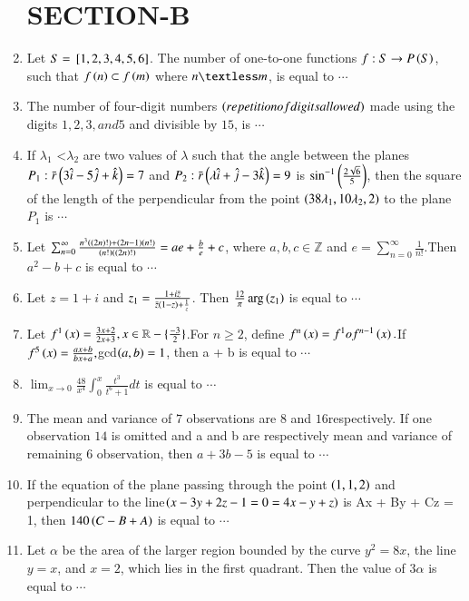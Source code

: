 \documentclass[journal,12pt,twocolumn]{IEEEtran}
\theoremstyle{remark}
\begin{document}
\begin{enumerate}[start=16]
\section{SECTION-B}
\item Let $S = {}\left[1, 2, 3, 4, 5, 6\right]$. The number of one-to-one functions $f : S \to P\left(S\right)$, such that $f\left(n\right) \subset f\left(m\right)$ where $n \textless m$, is equal to $\cdots$
\item The number of four-digit numbers $\left(repetition of digits allowed\right)$ made using the digits $1, 2, 3, and 5$ and divisible by $15$, is $\cdots$
\item If $\lambda_1$ \textless$ \lambda_2$ are two values of $\lambda$ such that the angle between the planes $P_1:\Bar{r}\left(3\hat{i} - 5\hat{j} + \hat{k} \right)= 7$ and $P_2: \Bar{r}\left(\lambda \hat{i} +\hat{j} - 3\hat{k}\right) = 9$ is 
$\sin^{-1}\left(\frac{2\sqrt{6}}{5}\right)$, then the square of the length of the perpendicular from the point $\left(38\lambda_1, 10\lambda_2, 2\right)$ to the plane $P_1$ is $\cdots$
\item Let $\sum_{n=0}^{\infty} \frac{n^3\left(\left(2n\right)!\right)+\left(2n-1\right)\left(n!\right)}{\left(n!\right)\left(\left(2n\right)!\right)} = ae+\frac{b}{e}+c$, where $a, b, c \in \mathbb{Z}$ and $e=\sum_{n=0}^{\infty}\frac{1}{n!}$.Then $a^2 - b + c$ is equal to $\cdots$
\item Let $ z = 1 + i $ and $z_1=\frac{1+i\Bar{z}}{\Bar{z}\left(1-z\right)+\frac{1}{z}}$. Then $\frac{12}{\pi}\arg\left(z_1\right)$ is equal to $\cdots$
\item Let $f^1\left(x\right) =\frac{3x+2}{2x+3} , x \in \mathbb{R}-\{\frac{-3}{2}\}$.For $ n \geq 2 $, define $f^n\left(x\right) = f^1of^{n-1}\left(x\right).$If$ f^5\left(x\right) = \frac{ax + b}{bx + a},$gcd$\left(a, b\right) = 1$,
then  a + b  is equal to $\cdots$
\item $\lim_{x \to 0} \frac{48}{x^4} \int_0^{x} \frac{t^3}{t^6+1}dt$ is equal to $\cdots$
\item The mean and variance of $7$ observations are $8$ and
$16$respectively. If one observation $14$ is omitted
and a and b are respectively mean and variance of
remaining $6$ observation, then $a + 3b -5$ is equal to $\cdots$
\item If the equation of the plane passing through the
point $\left(1, 1, 2\right)$ and perpendicular to the line$\left( x - 3y +
2z - 1 = 0 = 4x - y + z\right)$ is Ax + By + Cz = 1, then
		$140\left(C - B + A\right)$ is equal to $\cdots$
\item Let $\alpha$ be the area of the larger region bounded by the curve $y^2 = 8x$, the line $y = x$, and $x = 2$, which lies in the first quadrant. Then the value of $3\alpha$ is equal to $\cdots$





    
\end{enumerate}
\end{document}
